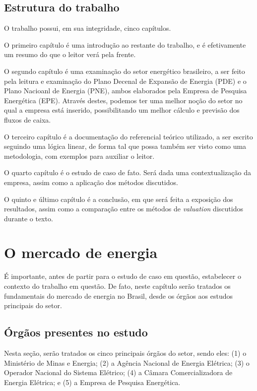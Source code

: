 \documentclass[aprovado,numbers]{coppe}
\begin{document}
  \hypertarget{estrutura-do-trabalho}{%
  \section{Estrutura do trabalho}\label{estrutura-do-trabalho}}

  O trabalho possui, em sua integridade, cinco capítulos.

  O primeiro capítulo é uma introdução ao restante do trabalho, e é efetivamente um resumo do que o leitor verá pela frente.

  O segundo capítulo é uma examinação do setor energético brasileiro, a ser feito pela leitura e examinação do Plano Decenal de Expansão de Energia (PDE) e o Plano Nacioanl de Energia (PNE), ambos elaborados pela Empresa de Pesquisa Energética (EPE). Através destes, podemos ter uma melhor noção do setor no qual a empresa está inserido, possibilitando um melhor cálculo e previsão dos fluxos de caixa.

  O terceiro capítulo é a documentação do referencial teórico utilizado, a ser escrito seguindo uma lógica linear, de forma tal que possa também ser visto como uma metodologia, com exemplos para auxiliar o leitor.

  O quarto capítulo é o estudo de caso de fato. Será dada uma contextualização da empresa, assim como a aplicação dos métodos discutidos.

  O quinto e último capítulo é a conclusão, em que será feita a exposição dos resultados, assim como a comparação entre os métodos de \emph{valuation} discutidos durante o texto.

  \hypertarget{o-mercado-de-energia}{%
  \chapter{O mercado de energia}\label{o-mercado-de-energia}}

  É importante, antes de partir para o estudo de caso em questão, estabelecer o contexto do trabalho em questão. De fato, neste capítulo serão tratados os fundamentais do mercado de energia no Brasil, desde os órgãos aos estudos principais do setor.

  \hypertarget{uxf3rguxe3os-presentes-no-estudo}{%
  \section{Órgãos presentes no estudo}\label{uxf3rguxe3os-presentes-no-estudo}}

  Nesta seção, serão tratados os cinco principais órgãos do setor, sendo eles: (1) o Ministério de Minas e Energia; (2) a Agência Nacional de Energia Elétrica; (3) o Operador Nacional do Sistema Elétrico; (4) a Câmara Comercializadora de Energia Elétrica; e (5) a Empresa de Pesquisa Energética.
\end{document}
